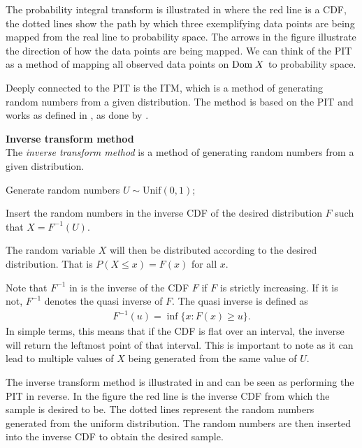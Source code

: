 The probability integral transform is illustrated in  where the red line is a \gls{CDF}, the dotted lines show the path by which three exemplifying data points are being mapped from the real line to probability space. The arrows in the figure illustrate the direction of how the data points are being mapped. We can think of the \gls{PIT} as a method of mapping all observed data points on $\mathrm{Dom \;} X$ to probability space.

Deeply connected to the \gls{PIT} is the \gls{ITM}, which is a method of generating random numbers from a given distribution. The method is based on the \gls{PIT} and works as defined in , as done by .
\begin{definition}\label{def:InverseTransformMethod}
    \textbf{Inverse transform method} \\
    The \emph{inverse transform method} is a method of generating random numbers from a given distribution.
    \begin{compactenum}
        \item Generate random numbers $U \sim \mathrm{Unif}(0,1)$;
        \item Insert the random numbers in the inverse \gls{CDF} of the desired distribution $F$ such that $X = F^{-1}(U)$.
    \end{compactenum}
    The random variable $X$ will then be distributed according to the desired distribution. That is $P(X\leq x) = F(x)$ for all $x$. 
\end{definition}

\begin{remark}
    Note that $F^{-1}$ in  is the inverse of the \gls{CDF} $F$ if $F$ is strictly increasing. If it is not, $F^{-1}$ denotes the quasi inverse of $F$. The quasi inverse is defined as
    \begin{align*}
        F^{-1}(u) = \inf\{x : F(x) \geq u\}.
    \end{align*}
    In simple terms, this means that if the \gls{CDF} is flat over an interval, the inverse will return the leftmost point of that interval. This is important to note as it can lead to multiple values of $X$ being generated from the same value of $U$.
\end{remark}

The inverse transform method is illustrated in  and can be seen as performing the \gls{PIT} in reverse. In the figure the red line is the inverse \gls{CDF} from which the sample is desired to be. The dotted lines represent the random numbers generated from the uniform distribution. The random numbers are then inserted into the inverse \gls{CDF} to obtain the desired sample.

